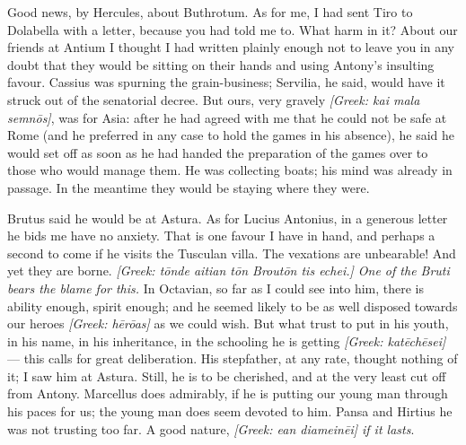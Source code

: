 

 Good news, by Hercules, about Buthrotum. As for me, I had sent Tiro to Dolabella with a letter, because you had told me to. What harm in it? About our friends at Antium I thought I had written plainly enough not to leave you in any doubt that they would be sitting on their hands and using Antony's insulting favour. Cassius was spurning the grain-business; Servilia, he said, would have it struck out of the senatorial decree. But ours, very gravely \textit{[Greek: kai mala semnōs]}, was for Asia: after he had agreed with me that he could not be safe at Rome (and he preferred in any case to hold the games in his absence), he said he would set off as soon as he had handed the preparation of the games over to those who would manage them. He was collecting boats; his mind was already in passage. In the meantime they would be staying where they were.

 Brutus said he would be at Astura. As for Lucius Antonius, in a generous letter he bids me have no anxiety. That is one favour I have in hand, and perhaps a second to come if he visits the Tusculan villa. The vexations are unbearable! And yet they are borne. \textit{[Greek: tōnde aitian tōn Broutōn tis echei.] One of the Bruti bears the blame for this.} In Octavian, so far as I could see into him, there is ability enough, spirit enough; and he seemed likely to be as well disposed towards our heroes \textit{[Greek: hērōas]} as we could wish. But what trust to put in his youth, in his name, in his inheritance, in the schooling he is getting \textit{[Greek: katēchēsei]} --- this calls for great deliberation. His stepfather, at any rate, thought nothing of it; I saw him at Astura. Still, he is to be cherished, and at the very least cut off from Antony. Marcellus does admirably, if he is putting our young man through his paces \dag for us\dag; the young man does seem devoted to him. Pansa and Hirtius he was not trusting too far. A good nature, \textit{[Greek: ean diameinēi] if it lasts}.
